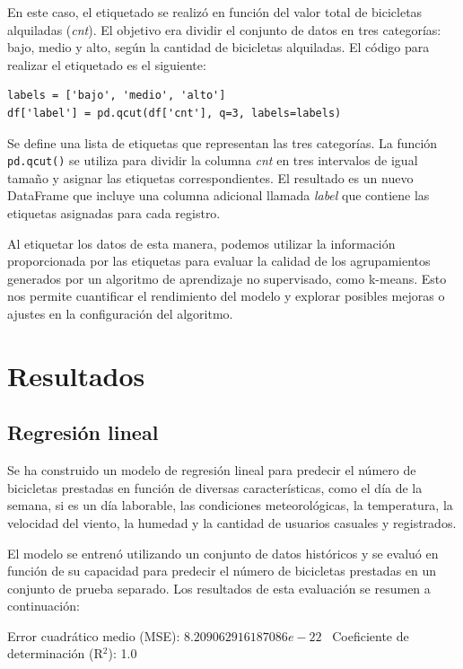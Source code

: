 \documentclass{wsdcr}
\begin{document}
En este caso, el etiquetado se realizó en función del valor total de bicicletas alquiladas (\textit{cnt}). El objetivo era dividir el conjunto de datos en tres categorías: bajo, medio y alto, según la cantidad de bicicletas alquiladas. El código para realizar el etiquetado es el siguiente:

{\fontsize{7pt}{12pt}\selectfont %
\begin{verbatim}
labels = ['bajo', 'medio', 'alto']
df['label'] = pd.qcut(df['cnt'], q=3, labels=labels)
\end{verbatim}
}

Se define una lista de etiquetas que representan las tres categorías. La función \texttt{pd.qcut()} se utiliza para dividir la columna \textit{cnt} en tres intervalos de igual tamaño y asignar las etiquetas correspondientes. El resultado es un nuevo DataFrame que incluye una columna adicional llamada \textit{label} que contiene las etiquetas asignadas para cada registro.

Al etiquetar los datos de esta manera, podemos utilizar la información proporcionada por las etiquetas para evaluar la calidad de los agrupamientos generados por un algoritmo de aprendizaje no supervisado, como k-means. Esto nos permite cuantificar el rendimiento del modelo y explorar posibles mejoras o ajustes en la configuración del algoritmo.

\section{Resultados}
\subsection{Regresión lineal}
Se ha construido un modelo de regresión lineal para predecir el número de bicicletas prestadas en función de diversas características, como el día de la semana, si es un día laborable, las condiciones meteorológicas, la temperatura, la velocidad del viento, la humedad y la cantidad de usuarios casuales y registrados.

El modelo se entrenó utilizando un conjunto de datos históricos y se evaluó en función de su capacidad para predecir el número de bicicletas prestadas en un conjunto de prueba separado. Los resultados de esta evaluación se resumen a continuación:

Error cuadrático medio (MSE): $8.209062916187086e-22$ \
Coeficiente de determinación (R$^2$): 1.0
\end{document}
